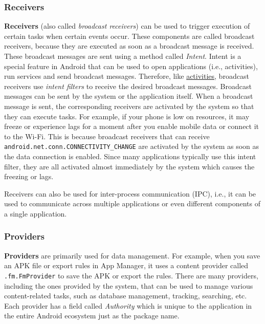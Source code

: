 \subsubsection{Receivers}\label{subsubsec:app-details-receivers} %
\textbf{Receivers} (also called \textit{broadcast receivers}) can be used to trigger execution of certain tasks when
certain events occur. These components are called broadcast receivers, because they are executed as soon as a broadcast
message is received. These broadcast messages are sent using a method called \textit{Intent}. Intent is a special
feature in Android that can be used to open applications (i.e., activities), run services and send broadcast messages.
Therefore, like \hyperref[subsubsec:activities]{activities}, broadcast receivers use \textit{intent filters} to receive
the desired broadcast messages. Broadcast messages can be sent by the system or the application itself. When a broadcast
message is sent, the corresponding receivers are activated by the system so that they can execute tasks. For example, if
your phone is low on resources, it may freeze or experience lags for a moment after you enable mobile data or connect it
to the Wi-Fi. This is because broadcast receivers that can receive \texttt{android.net.conn.CONNECTIVITY\_CHANGE} are
activated by the system as soon as the data connection is enabled. Since many applications typically use this intent
filter, they are all activated almost immediately by the system which causes the freezing or lags.

Receivers can also be used for inter-process communication (IPC), i.e., it can be used to communicate across multiple
applications or even different components of a single application.

\subsubsection{Providers}\label{subsubsec:providers} %
\textbf{Providers} are primarily used for data management. For example, when you save an APK file or
export rules in App Manager, it uses a content provider called \texttt{.fm.FmProvider} to save the
APK or export the rules. There are many providers, including the ones provided by the system, that
can be used to manage various content-related tasks, such as database management, tracking,
searching, etc. Each provider has a field called \textit{Authority} which is unique to the
application in the entire Android ecosystem just as the package name.

